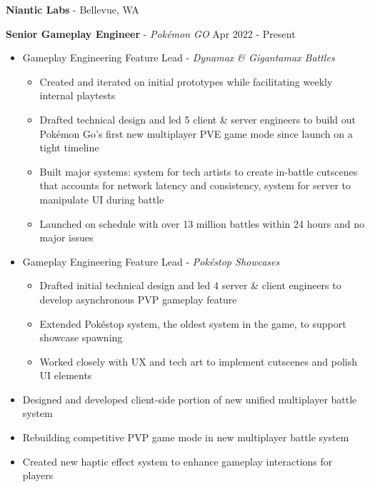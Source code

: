 \documentclass[resmargin,10pt]{res} %
\begin{document}
\begin{resume}
     {\bf Niantic Labs} - Bellevue, WA \\
    \begin{ncolumn}{1}
        {\bf Senior Gameplay Engineer} - \textit{Pokémon GO} \hfill Apr 2022 - Present
    \end{ncolumn}
    \begin{itemize}
        \setlength\itemsep{-0.1em}
        \item Gameplay Engineering Feature Lead - \textit{Dynamax \& Gigantamax Battles}
        \begin{itemize}[leftmargin=0.5em,topsep=0.0em]
            \setlength\itemsep{-0.0em}
            \item Created and iterated on initial prototypes while facilitating weekly internal playtests
            \item Drafted technical design and led 5 client \& server engineers to build out Pokémon Go's first new multiplayer PVE game mode since launch on a tight timeline
            \item Built major systems: system for tech artists to create in-battle cutscenes that accounts for network latency and consistency, system for server to manipulate UI during battle
            \item Launched on schedule with over 13 million battles within 24 hours and no major issues
        \end{itemize}
        \item Gameplay Engineering Feature Lead - \textit{Pokéstop Showcases}
        \begin{itemize}[leftmargin=0.5em,topsep=0.0em]
            \setlength\itemsep{-0.0em}
            \item Drafted initial technical design and led 4 server \& client engineers to develop asynchronous PVP gameplay feature
            \item Extended Pokéstop system, the oldest system in the game, to support showcase spawning
            \item Worked closely with UX and tech art to implement cutscenes and polish UI elements
        \end{itemize}
        \item Designed and developed client-side portion of new unified multiplayer battle system
        \item Rebuilding competitive PVP game mode in new multiplayer battle system
        \item Created new haptic effect system to enhance gameplay interactions for players

\end{itemize}
\end{resume}
\end{document}
